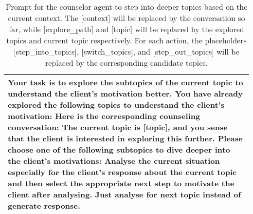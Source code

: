 \begin{table*}[tb]
\begin{tabularx}{\textwidth}{X}
\toprule
{\sf \footnotesize Your task is to explore the subtopics of the current topic to understand the client's motivation better. \newline \newline You have already explored the following topics to understand the client’s motivation:  \newline Here is the corresponding counseling conversation: \newline [context] \newline The current topic is [topic], and you sense that the client is interested in exploring this further. Please choose one of the following subtopics to dive deeper into the client's motivations:  \newline \newline Analyse the current situation especially for the client's response about the current topic and then select the appropriate next step to motivate the client after analysing. Just analyse for next topic instead of generate response. }
\\ \bottomrule
\end{tabularx}
\caption{Prompt for the counselor agent to step into deeper topics based on the current context. The [context] will be replaced by the conversation so far, while [explore\_path] and [topic] will be replaced by the explored topics and current topic respectively. For each action, the placeholders [step\_into\_topics], [switch\_topics], and [step\_out\_topics] will be replaced by the corresponding candidate topics.}
\label{tab:topic step into}
\end{table*}

